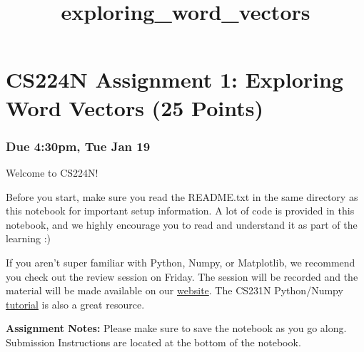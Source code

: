\documentclass[11pt]{article}
\title{exploring\_word\_vectors}
\begin{document}
    
    \maketitle
    
    

    
    \hypertarget{cs224n-assignment-1-exploring-word-vectors-25-points}{%
\section{CS224N Assignment 1: Exploring Word Vectors (25
Points)}\label{cs224n-assignment-1-exploring-word-vectors-25-points}}

\hypertarget{due-430pm-tue-jan-19}{%
\subsubsection{\texorpdfstring{ Due 4:30pm, Tue Jan 19
}{ Due 4:30pm, Tue Jan 19 }}\label{due-430pm-tue-jan-19}}

Welcome to CS224N!

Before you start, make sure you read the README.txt in the same
directory as this notebook for important setup information. A lot of
code is provided in this notebook, and we highly encourage you to read
and understand it as part of the learning :)

If you aren't super familiar with Python, Numpy, or Matplotlib, we
recommend you check out the review session on Friday. The session will
be recorded and the material will be made available on our
\href{http://web.stanford.edu/class/cs224n/index.html\#schedule}{website}.
The CS231N Python/Numpy
\href{https://cs231n.github.io/python-numpy-tutorial/}{tutorial} is also
a great resource.

\textbf{Assignment Notes:} Please make sure to save the notebook as you
go along. Submission Instructions are located at the bottom of the
notebook.
\end{document}
